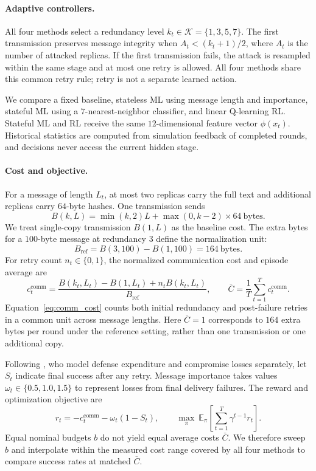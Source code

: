 \documentclass{article}
\begin{document}
\paragraph{Adaptive controllers.}
All four methods select a redundancy level $k_t \in \mathcal{K} = \{1, 3, 5, 7\}$. The first transmission preserves message integrity when $A_t < (k_t + 1)/2$, where $A_t$ is the number of attacked replicas. If the first transmission fails, the attack is resampled within the same stage and at most one retry is allowed. All four methods share this common retry rule; retry is not a separate learned action.

We compare a fixed baseline, stateless {ML} using message length and importance, stateful {ML} using a $7$-nearest-neighbor classifier, and linear Q-learning {RL}. Stateful {ML} and {RL} receive the same $12$-dimensional feature vector $\phi(x_t)$. Historical statistics are computed from simulation feedback of completed rounds, and decisions never access the current hidden stage.

\paragraph{Cost and objective.}
For a message of length $L_t$, at most two replicas carry the full text and additional replicas carry $64$-byte hashes. One transmission sends
\[
B(k, L) = \min(k, 2)L + \max(0, k - 2) \times 64\ \text{bytes}.
\]
We treat single-copy transmission $B(1, L)$ as the baseline cost. The extra bytes for a $100$-byte message at redundancy $3$ define the normalization unit:
\[
B_{\mathrm{ref}} = B(3, 100) - B(1, 100) = 164\ \text{bytes}.
\]
For retry count $n_t \in \{0, 1\}$, the normalized communication cost and episode average are
\begin{equation}
c_t^{\mathrm{comm}} = \frac{B(k_t, L_t) - B(1, L_t) + n_t B(k_t, L_t)}{B_{\mathrm{ref}}}, \qquad
\bar{C} = \frac{1}{T}\sum_{t=1}^{T} c_t^{\mathrm{comm}}.
\label{eq:comm_cost}
\end{equation}
Equation~\eqref{eq:comm_cost} counts both initial redundancy and post-failure retries in a common unit across message lengths. Here $\bar{C} = 1$ corresponds to $164$ extra bytes per round under the reference setting, rather than one transmission or one additional copy.

Following \citet{nyberg2023learning}, who model defense expenditure and compromise losses separately, let $S_t$ indicate final success after any retry. Message importance takes values $\omega_t \in \{0.5, 1.0, 1.5\}$ to represent losses from final delivery failures. The reward and optimization objective are
\[
r_t = -c_t^{\mathrm{comm}} - \omega_t (1 - S_t), \qquad
\max_{\pi}\ \mathbb{E}_{\pi}\left[\sum_{t=1}^{T} \gamma^{t-1} r_t\right].
\]
Equal nominal budgets $b$ do not yield equal average costs $\bar{C}$. We therefore sweep $b$ and interpolate within the measured cost range covered by all four methods to compare success rates at matched $\bar{C}$.
\end{document}

